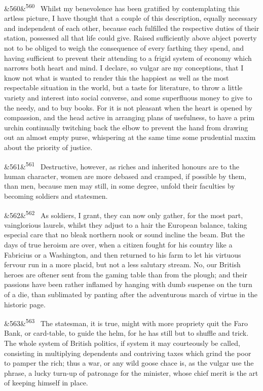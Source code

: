 \documentclass[12pt]{article}
\newcommand{\para}[1][]{\par\noindent\ifx&#1&\else\textsuperscript{\footnotesize #1}~\fi}
\begin{document}
\para[560] Whilst my benevolence has been gratified by contemplating this artless picture, I have thought that a couple of this description, equally necessary and independent of each other, because each fulfilled the respective duties of their station, possessed all that life could give. Raised sufficiently above abject poverty not to be obliged to weigh the consequence of every farthing they spend, and having sufficient to prevent their attending to a frigid system of economy which narrows both heart and mind. I declare, so vulgar are my conceptions, that I know not what is wanted to render this the happiest as well as the most respectable situation in the world, but a taste for literature, to throw a little variety and interest into social converse, and some superfluous money to give to the needy, and to buy books. For it is not pleasant when the heart is opened by compassion, and the head active in arranging plans of usefulness, to have a prim urchin continually twitching back the elbow to prevent the hand from drawing out an almost empty purse, whispering at the same time some prudential maxim about the priority of justice.

\para[561] Destructive, however, as riches and inherited honours are to the human character, women are more debased and cramped, if possible by them, than men, because men may still, in some degree, unfold their faculties by becoming soldiers and statesmen.

\para[562] As soldiers, I grant, they can now only gather, for the most part, vainglorious laurels, whilst they adjust to a hair the European balance, taking especial care that no bleak northern nook or sound incline the beam. But the days of true heroism are over, when a citizen fought for his country like a Fabricius or a Washington, and then returned to his farm to let his virtuous fervour run in a more placid, but not a less salutary stream. No, our British heroes are oftener sent from the gaming table than from the plough; and their passions have been rather inflamed by hanging with dumb suspense on the turn of a die, than sublimated by panting after the adventurous march of virtue in the historic page.

\para[563] The statesman, it is true, might with more propriety quit the Faro Bank, or card-table, to guide the helm, for he has still but to shuffle and trick. The whole system of British politics, if system it may courteously be called, consisting in multiplying dependents and contriving taxes which grind the poor to pamper the rich; thus a war, or any wild goose chace is, as the vulgar use the phrase, a lucky turn-up of patronage for the minister, whose chief merit is the art of keeping himself in place.
\end{document}

